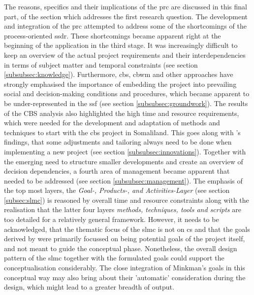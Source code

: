 The reasons, specifics and their implications of the \acrlong{prc} are discussed in this final part, of the section which addresses the first research question. The development and integration of the \acrshort{prc} attempted to address some of the shortcomings of the process-oriented \acrshort{ssdr}. These shortcomings became apparent right at the beginning of the application in the third stage. It was increasingly difficult to keep an overview of the actual project requirements and their interdependencies in terms of subject matter and temporal constraints (see section \ref{subsubsec:knowledge}). Furthermore, \acrshort{cbs}, \acrshort{cbwm} and other approaches have strongly emphasised the importance of embedding the project into prevailing social and decision-making conditions and procedures, which became apparent to be under-represented in the \acrshort{ssf} (see section \ref{subsubsec:groundwork}). The results of the CBS analysis also highlighted the high time and resource requirements, which were needed for the development and adaptation of methods and techniques to start with the \acrshort{cbs} project in Somaliland. This goes along with \autocite{garciaFindingWhatYou2021}'s findings, that some adjustments and tailoring always need to be done when implementing a new project (see section \ref{subsubsec:innovations}). Together with the emerging need to structure smaller developments and create an overview of decision dependencies, a fourth area of management became apparent that needed to be addressed (see section \ref{subsubsec:management}).\newline
The emphasis of the top most layers, the \textit{Goal-, Products-, and Activities-Layer} (see section \ref{subsec:slmc}) is reasoned by overall time and resource constraints along with the realisation that the latter four layers \textit{methods, techniques, tools and scripts} are too detailed for a relatively general framework. However, it needs to be acknowledged, that the thematic focus of the \acrshort{slmc} is not on \acrshort{cs} and that the goals derived by \autocite{minkmanCitizenScienceWater2015} were primarily focussed on being potential goals of the project itself, and not meant to guide the conceptual phase. Nonetheless, the overall design pattern of the \acrshort{slmc} together with the formulated goals could support the conceptualisation considerably. The close integration of Minkman's goals in this conceptual way may also bring about their 'automatic' consideration during the design, which might lead to a greater breadth of output.\newline
